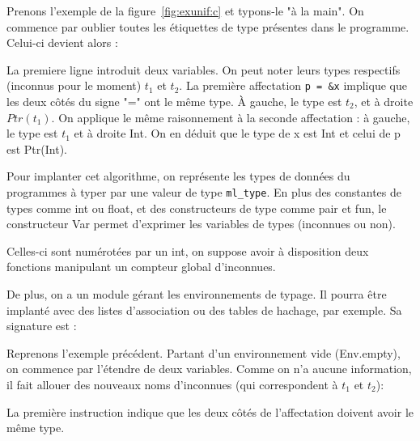 Prenons l'exemple de la figure~\ref{fig:exunif:c} et typons-le "à la main". On
commence par oublier toutes les étiquettes de type présentes dans le programme.
Celui-ci devient alors :


La premiere ligne introduit deux variables. On peut noter leurs types respectifs
(inconnus pour le moment) $t_1$ et $t_2$. La première affectation \texttt{p =
\&x} implique que les deux côtés du signe "=" ont le même type. À gauche, le
type est $t_2$, et à droite $Ptr(t_1)$. On applique le même raisonnement à la
seconde affectation : à gauche, le type est $t_1$ et à droite Int. On en déduit
que le type de x est Int et celui de p est Ptr(Int).



Pour implanter cet algorithme, on représente les types de données du programmes
à typer par une valeur de type \texttt{ml\_type}. En plus des constantes de
types comme int ou float, et des constructeurs de type comme pair et fun, le
constructeur Var permet d'exprimer les variables de types (inconnues ou non).

Celles-ci sont numérotées par un int, on suppose avoir à disposition deux
fonctions manipulant un compteur global d'inconnues.


De plus, on a un module gérant les environnements de typage. Il pourra être
implanté avec des listes d'association ou des tables de hachage, par exemple. Sa
signature est :


Reprenons l'exemple précédent. Partant d'un environnement vide (Env.empty), on
commence par l'étendre de deux variables. Comme on n'a aucune information, il
fait allouer des nouveaux noms d'inconnues (qui correspondent à $t_1$ et $t_2$):


La première instruction indique que les deux côtés de l'affectation doivent
avoir le même type.


